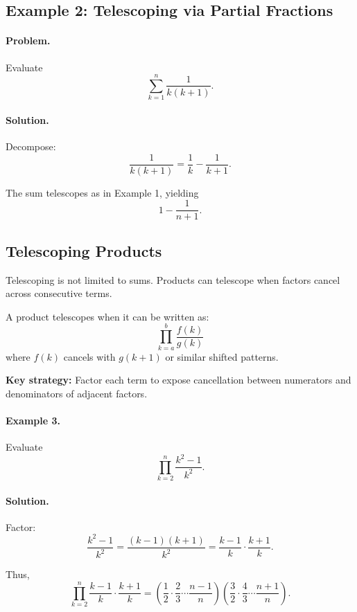 \documentclass[12pt]{extarticle}
\begin{document}
\subsection*{Example 2: Telescoping via Partial Fractions}

\paragraph{Problem.}
Evaluate
\[
\sum_{k=1}^{n} \frac{1}{k(k+1)}.
\]

\paragraph{Solution.}
Decompose:
\[
\frac{1}{k(k+1)} = \frac{1}{k} - \frac{1}{k+1}.
\]

The sum telescopes as in Example 1, yielding
\[
1 - \frac{1}{n+1}.
\]

\subsection*{Telescoping Products}

Telescoping is not limited to sums. Products can telescope when factors cancel across consecutive terms.

\begin{conceptbox}
A product telescopes when it can be written as:
\[
\prod_{k=a}^{b} \frac{f(k)}{g(k)}
\]
where $f(k)$ cancels with $g(k+1)$ or similar shifted patterns.

\textbf{Key strategy:} Factor each term to expose cancellation between numerators and denominators of adjacent factors.
\end{conceptbox}

\paragraph{Example 3.}
Evaluate
\[
\prod_{k=2}^{n} \frac{k^2 - 1}{k^2}.
\]

\paragraph{Solution.}
Factor:
\[
\frac{k^2 - 1}{k^2} = \frac{(k-1)(k+1)}{k^2} = \frac{k-1}{k} \cdot \frac{k+1}{k}.
\]

Thus,
\[
\prod_{k=2}^{n} \frac{k-1}{k} \cdot \frac{k+1}{k}
= \left( \frac{1}{2} \cdot \frac{2}{3} \cdots \frac{n-1}{n} \right)
\left( \frac{3}{2} \cdot \frac{4}{3} \cdots \frac{n+1}{n} \right).
\]
\end{document}
